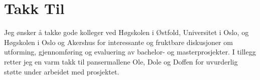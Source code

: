\cleardoublepage
\chapter*{Takk Til}

Jeg ønsker å takke gode kolleger ved Høgskolen i Østfold, Universitet i Oslo, og Høgskolen i Oslo og Akershus for interessante og fruktbare diskusjoner om utforming, gjennomføring og evaluering av bachelor- og masterprosjekter. I tillegg retter jeg en varm takk til pansermallene Ole, Dole og Doffen for uvurderlig støtte under arbeidet med prosjektet.

